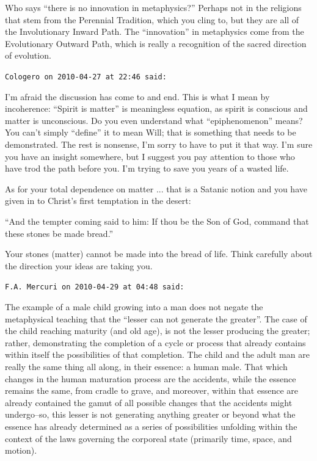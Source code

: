 \begin{footnotesize}
\begin{sffamily}
Who says ``there is no innovation in metaphysics?'' Perhaps not in the religions that stem from the Perennial Tradition, which you cling to, but they are all of the Involutionary Inward Path. The ``innovation'' in metaphysics come from the Evolutionary Outward Path, which is really a recognition of the sacred direction of evolution.

\hfill

\texttt{Cologero on 2010-04-27 at 22:46 said:}

I'm afraid the discussion has come to and end. This is what I mean by incoherence: ``Spirit is matter'' is meaningless equation, as spirit is conscious and matter is unconscious. Do you even understand what ``epiphenomenon'' means? You can't simply ``define'' it to mean Will; that is something that needs to be demonstrated. The rest is nonsense, I'm sorry to have to put it that way. I'm sure you have an insight somewhere, but I suggest you pay attention to those who have trod the path before you. I'm trying to save you years of a wasted life.

As for your total dependence on matter ... that is a Satanic notion and you have given in to Christ's first temptation in the desert:

``And the tempter coming said to him: If thou be the Son of God, command that these stones be made bread.''

Your stones (matter) cannot be made into the bread of life. Think carefully about the direction your ideas are taking you.

\hfill

\texttt{F.A. Mercuri on 2010-04-29 at 04:48 said:}

The example of a male child growing into a man does not negate the metaphysical teaching that the ``lesser can not generate the greater''. The case of the child reaching maturity (and old age), is not the lesser producing the greater; rather, demonstrating the completion of a cycle or process that already contains within itself the possibilities of that completion. The child and the adult man are really the same thing all along, in their essence: a human male. That which changes in the human maturation process are the accidents, while the essence remains the same, from cradle to grave, and moreover, within that essence are already contained the gamut of all possible changes that the accidents might undergo--so, this lesser is not generating anything greater or beyond what the essence has already determined as a series of possibilities unfolding within the context of the laws governing the corporeal state (primarily time, space, and motion).


\end{sffamily}
\end{footnotesize}
